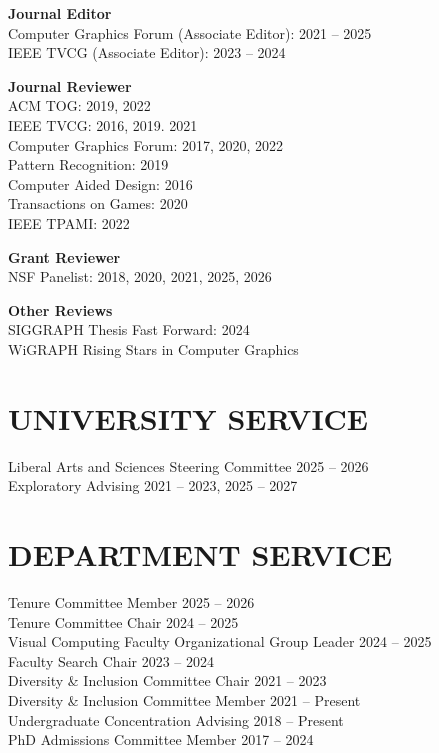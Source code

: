 \documentclass[line,margin]{res}
\begin{document}
\begin{resume}
\textbf{Journal Editor}\\
Computer Graphics Forum (Associate Editor): 2021 -- 2025\\
IEEE TVCG (Associate Editor): 2023 -- 2024

\textbf{Journal Reviewer}\\
ACM TOG: 2019, 2022\\
IEEE TVCG: 2016, 2019. 2021\\
Computer Graphics Forum: 2017, 2020, 2022\\
Pattern Recognition: 2019\\
Computer Aided Design: 2016\\
Transactions on Games: 2020\\
IEEE TPAMI: 2022

\textbf{Grant Reviewer}\\
NSF Panelist: 2018, 2020, 2021, 2025, 2026

\textbf{Other Reviews}\\
SIGGRAPH Thesis Fast Forward: 2024\\
WiGRAPH Rising Stars in Computer Graphics


\section{UNIVERSITY SERVICE}

Liberal Arts and Sciences Steering Committee \hfill 2025 -- 2026
\\
Exploratory Advising \hfill 2021 -- 2023, 2025 -- 2027


\section{DEPARTMENT SERVICE}

Tenure Committee Member \hfill 2025 -- 2026
\\
Tenure Committee Chair \hfill 2024 -- 2025
\\
Visual Computing Faculty Organizational Group Leader \hfill 2024 -- 2025
\\
Faculty Search Chair \hfill 2023 -- 2024
\\
Diversity \& Inclusion Committee Chair \hfill 2021 -- 2023
\\ 
Diversity \& Inclusion Committee Member \hfill 2021 -- Present
\\
Undergraduate Concentration Advising \hfill 2018 -- Present
\\ 
PhD Admissions Committee Member \hfill 2017 -- 2024


\end{resume}
\end{document}
